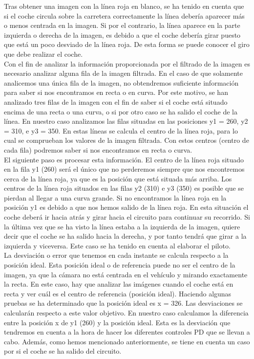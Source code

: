 Tras obtener una imagen con la línea roja en blanco, se ha tenido en cuenta que si el coche circula sobre la carretera correctamente la línea debería aparecer más o menos centrada en la imagen. Si por el contrario, la línea aparece en la parte izquierda o derecha de la imagen, es debido a que el coche debería girar puesto que está un poco desviado de la línea roja. De esta forma se puede conocer el giro que debe realizar el coche.\\

Con el fin de analizar la información proporcionada por el filtrado de la imagen es necesario analizar alguna fila de la imagen filtrada. En el caso de que solamente analicemos una única fila de la imagen, no obtendremos suficiente información para saber si nos encontramos en recta o en curva. Por este motivo, se han analizado tres filas de la imagen con el fin de saber si el coche está situado encima de una recta o una curva, o si por otro caso se ha salido el coche de la línea. En nuestro caso analizamos las filas situadas en las posiciones y1 = 260, y2 = 310, e y3 = 350. En estas líneas se calcula el centro de la línea roja, para lo cual se comprueban los valores de la imagen filtrada. Con estos centros (centro de cada fila) podremos saber si nos encontramos en recta o curva.\\

El siguiente paso es procesar esta información. El centro de la línea roja situado en la fila y1 (260) será el único que no perderemos siempre que nos encontremos cerca de la línea roja, ya que es la posición que está situada más arriba. Los centros de la línea roja situados en las filas y2 (310) e y3 (350) es posible que se pierdan al llegar a una curva grande. Si no encontramos la línea roja en la posición y1 es debido a que nos hemos salido de la línea roja. En esta situación el coche deberá ir hacia atrás y girar hacia el circuito para continuar su recorrido. Si la última vez que se ha visto la línea estaba a la izquierda de la imagen, quiere decir que el coche se ha salido hacia la derecha, y por tanto tendrá que girar a la izquierda y viceversa. Este caso se ha tenido en cuenta al elaborar el piloto.\\

La desviación o error que tenemos en cada instante se calcula respecto a la posición ideal. Esta posición ideal o de referencia puede no ser el centro de la imagen, ya que la cámara no está centrada en el vehículo y mirando exactamente la recta. En este caso, hay que analizar las imágenes cuando el coche está en recta y ver cuál es el centro de referencia (posición ideal). Haciendo algunas pruebas se ha determinado que la posición ideal es x = 326. Las desviaciones se calcularán respecto a este valor objetivo. En nuestro caso calculamos la diferencia entre la posición x de y1 (260) y la posición ideal. Esta es la desviación que tendremos en cuenta a la hora de hacer los diferentes controles PD que se llevan a cabo. Además, como hemos mencionado anteriormente, se tiene en cuenta un caso por si el coche se ha salido del circuito.\\

